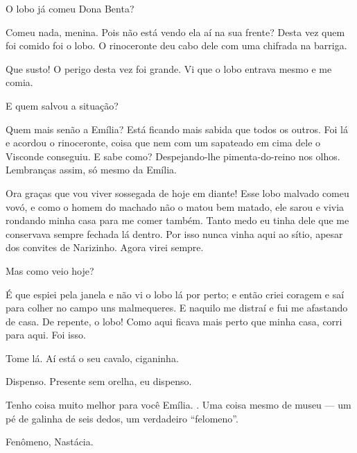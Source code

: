  O lobo já comeu Dona Benta?

 Comeu nada, menina. Pois não está vendo ela aí na sua
frente? Desta vez quem foi comido foi o lobo. O rinoceronte deu cabo
dele com uma chifrada na barriga.


 Que susto! O perigo desta vez foi grande. Vi que o lobo
entrava mesmo e me comia.

 E quem salvou a situação?

 Quem mais senão a Emília? Está ficando mais sabida que
todos os outros. Foi lá e acordou o rinoceronte, coisa que nem com um
sapateado em cima dele o Visconde conseguiu. E sabe como? Despejando-lhe
pimenta-do-reino nos olhos. Lembranças assim, só mesmo da Emília.

  Ora graças que vou viver sossegada
de hoje em diante! Esse lobo malvado comeu vovó, e como o homem do
machado não o matou bem matado, ele sarou e vivia rondando minha casa
para me comer também. Tanto medo eu tinha dele que me conservava sempre
fechada lá dentro. Por isso nunca vinha aqui ao sítio, apesar dos
convites de Narizinho. Agora virei sempre.

 Mas como veio hoje?

 É que espiei pela janela e não vi o lobo lá por perto; e
então criei coragem e saí para colher no campo uns malmequeres. E
naquilo me distraí e fui me afastando de casa. De repente, o lobo! Como
aqui ficava mais perto que minha casa, corri para aqui. Foi isso.

  Tome lá. Aí está o
seu cavalo, ciganinha.


 Dispenso. Presente sem orelha, eu dispenso.

 Tenho coisa muito melhor para você Emília. . Uma coisa mesmo de museu --- um pé
de galinha de seis dedos, um verdadeiro ``felomeno''.

 Fenômeno, Nastácia.

